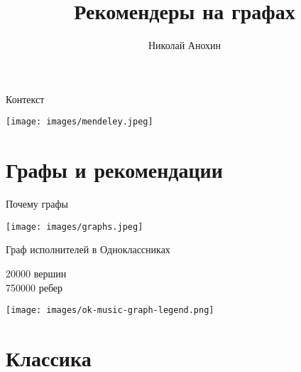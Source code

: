 \documentclass[11pt,aspectratio=169,handout]{beamer}
\author{Николай Анохин}
\title{Рекомендеры на графах}
\begin{document}
{

\begin{frame}
\titlepage
\end{frame}


}

\begin{frame}{Контекст}

\begin{center}
\texttt{[image: images/mendeley.jpeg]}
\end{center}

\end{frame}

\section{Графы и рекомендации}

\begin{frame}{Почему графы}

\begin{center}
\texttt{[image: images/graphs.jpeg]}
\end{center}

\end{frame}

{
\begin{frame}[plain]{Граф исполнителей в Одноклассниках}

20000 вершин \\
750000 ребер

\vspace{1em}

\texttt{[image: images/ok-music-graph-legend.png]}

\end{frame}
}

\section{Классика}
\end{document}

